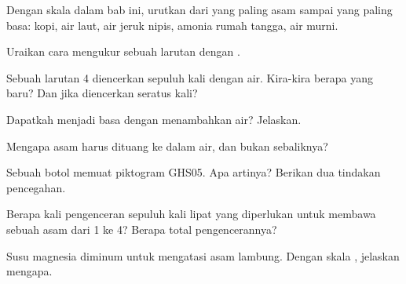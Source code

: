 \begin{exercise}[$\star$]\label{exo:g9:acids-bases-ph:3}
Dengan skala  dalam bab ini, urutkan dari yang paling asam sampai yang
paling basa: kopi, air laut, air jeruk nipis, amonia rumah tangga, air
murni.
\end{exercise}

\begin{exercise}[$\star$]\label{exo:g9:acids-bases-ph:4}
Uraikan cara mengukur  sebuah larutan dengan .
\end{exercise}

\begin{exercise}[$\star\star$]\label{exo:g9:acids-bases-ph:5}
Sebuah larutan  4 diencerkan sepuluh kali dengan air. Kira-kira
berapa  yang baru? Dan jika diencerkan seratus kali?
\end{exercise}

\begin{exercise}[$\star\star$]\label{exo:g9:acids-bases-ph:6}
Dapatkah  menjadi basa dengan menambahkan air? Jelaskan.
\end{exercise}

\begin{exercise}[$\star\star$]\label{exo:g9:acids-bases-ph:7}
Mengapa asam harus dituang ke dalam air, dan bukan sebaliknya?
\end{exercise}

\begin{exercise}[$\star\star$]\label{exo:g9:acids-bases-ph:8}
Sebuah botol memuat piktogram GHS05. Apa artinya? Berikan dua tindakan
pencegahan.
\end{exercise}

\begin{exercise}[$\star\star$]\label{exo:g9:acids-bases-ph:9}
Berapa kali pengenceran sepuluh kali lipat yang diperlukan untuk membawa
sebuah asam dari  1 ke  4? Berapa total pengencerannya?
\end{exercise}

\begin{exercise}[$\star\star$]\label{exo:g9:acids-bases-ph:10}
Susu magnesia diminum untuk mengatasi asam lambung. Dengan skala ,
jelaskan mengapa.
\end{exercise}

